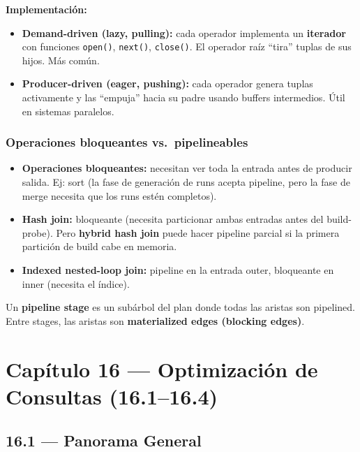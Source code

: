 \documentclass[11pt, a4paper]{article}
\begin{document}
\textbf{Implementación:}
\begin{itemize}[nosep]
	\item \textbf{Demand-driven (lazy, pulling):} cada operador implementa un \textbf{iterador} con funciones \texttt{open()}, \texttt{next()}, \texttt{close()}. El operador raíz ``tira'' tuplas de sus hijos. Más común.
	\item \textbf{Producer-driven (eager, pushing):} cada operador genera tuplas activamente y las ``empuja'' hacia su padre usando buffers intermedios. Útil en sistemas paralelos.
\end{itemize}

\subsubsection{Operaciones bloqueantes vs.\ pipelineables}

\begin{itemize}[nosep]
	\item \textbf{Operaciones bloqueantes:} necesitan ver toda la entrada antes de producir salida. Ej: sort (la fase de generación de runs acepta pipeline, pero la fase de merge necesita que los runs estén completos).
	\item \textbf{Hash join:} bloqueante (necesita particionar ambas entradas antes del build-probe). Pero \textbf{hybrid hash join} puede hacer pipeline parcial si la primera partición de build cabe en memoria.
	\item \textbf{Indexed nested-loop join:} pipeline en la entrada outer, bloqueante en inner (necesita el índice).
\end{itemize}

Un \textbf{pipeline stage} es un subárbol del plan donde todas las aristas son pipelined. Entre stages, las aristas son \textbf{materialized edges (blocking edges)}.

\newpage
\section{Capítulo 16 --- Optimización de Consultas (16.1--16.4)}

\subsection{16.1 --- Panorama General}
\end{document}
